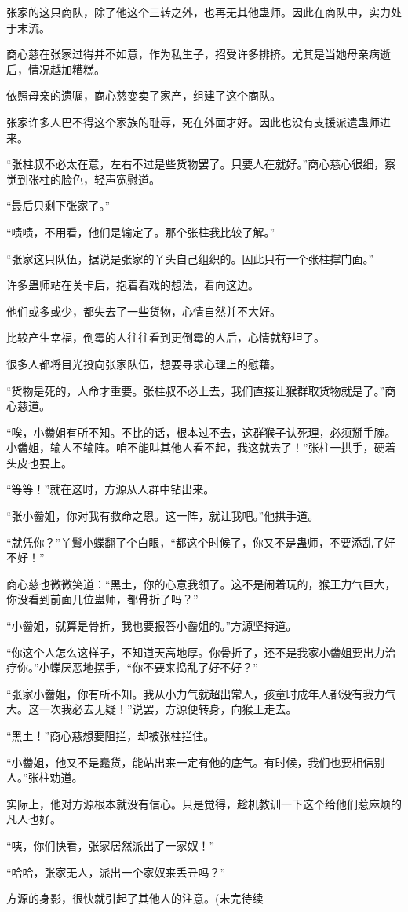 \begin{this_body}
张家的这只商队，除了他这个三转之外，也再无其他蛊师。因此在商队中，实力处于末流。

商心慈在张家过得并不如意，作为私生子，招受许多排挤。尤其是当她母亲病逝后，情况越加糟糕。

依照母亲的遗嘱，商心慈变卖了家产，组建了这个商队。

张家许多人巴不得这个家族的耻辱，死在外面才好。因此也没有支援派遣蛊师进来。

“张柱叔不必太在意，左右不过是些货物罢了。只要人在就好。”商心慈心很细，察觉到张柱的脸色，轻声宽慰道。

“最后只剩下张家了。”

“啧啧，不用看，他们是输定了。那个张柱我比较了解。”

“张家这只队伍，据说是张家的丫头自己组织的。因此只有一个张柱撑门面。”

许多蛊师站在关卡后，抱着看戏的想法，看向这边。

他们或多或少，都失去了一些货物，心情自然并不大好。

比较产生幸福，倒霉的人往往看到更倒霉的人后，心情就舒坦了。

很多人都将目光投向张家队伍，想要寻求心理上的慰藉。

“货物是死的，人命才重要。张柱叔不必上去，我们直接让猴群取货物就是了。”商心慈道。

“唉，小齤姐有所不知。不比的话，根本过不去，这群猴子认死理，必须掰手腕。小齤姐，输人不输阵。咱不能叫其他人看不起，我这就去了！”张柱一拱手，硬着头皮也要上。

“等等！”就在这时，方源从人群中钻出来。

“张小齤姐，你对我有救命之恩。这一阵，就让我吧。”他拱手道。

“就凭你？”丫鬟小蝶翻了个白眼，“都这个时候了，你又不是蛊师，不要添乱了好不好！”

商心慈也微微笑道：“黑土，你的心意我领了。这不是闹着玩的，猴王力气巨大，你没看到前面几位蛊师，都骨折了吗？”

“小齤姐，就算是骨折，我也要报答小齤姐的。”方源坚持道。

“你这个人怎么这样子，不知道天高地厚。你骨折了，还不是我家小齤姐要出力治疗你。”小蝶厌恶地摆手，“你不要来捣乱了好不好？”

“张家小齤姐，你有所不知。我从小力气就超出常人，孩童时成年人都没有我力气大。这一次我必去无疑！”说罢，方源便转身，向猴王走去。

“黑土！”商心慈想要阻拦，却被张柱拦住。

“小齤姐，他又不是蠢货，能站出来一定有他的底气。有时候，我们也要相信别人。”张柱劝道。

实际上，他对方源根本就没有信心。只是觉得，趁机教训一下这个给他们惹麻烦的凡人也好。

“咦，你们快看，张家居然派出了一家奴！”

“哈哈，张家无人，派出一个家奴来丢丑吗？”

方源的身影，很快就引起了其他人的注意。(未完待续

\end{this_body}

